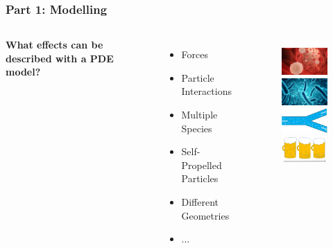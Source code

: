 \documentclass[aspectratio=169,xcolor=dvipsnames]{beamer}
\begin{document}
\begin{frame}
	\frametitle{Part 1: Modelling}
	\begin{columns}
		\textbf{What effects can be described with a PDE model?}
		\begin{itemize}
			\item Forces
			\item Particle Interactions
			\item Multiple Species
			\item Self-Propelled Particles
			\item Different Geometries
			\item ...
		\end{itemize}
		\vspace{-1cm}
		\begin{figure}
			\includegraphics[width=3cm]{bloodcells.jpg}\\
			\includegraphics[width=3cm]{bacteria.png}\\
			\includegraphics[width=3cm]{Microfilter.png}\\
			\includegraphics[width=3cm]{beer.png}
		\end{figure}
	\end{columns}
\end{frame}
\end{document}
